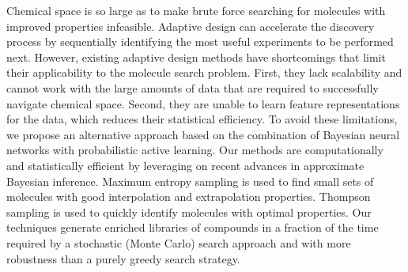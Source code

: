 
Chemical space is so large as to make brute force searching for molecules with
improved properties infeasible. Adaptive design can accelerate the discovery
process by sequentially identifying the most useful experiments to be performed
next. However, existing adaptive design methods have shortcomings that limit
their applicability to the molecule search problem. First, they lack
scalability and cannot work with the large amounts of data that are required to
successfully navigate chemical space. Second, they are unable to learn feature
representations for the data, which reduces their statistical efficiency. To
avoid these limitations, we propose an alternative approach based on the
combination of Bayesian neural networks with probabilistic active learning. Our
methods are computationally and statistically efficient by leveraging on recent
advances in approximate Bayesian inference. Maximum entropy sampling is used
to find small sets of molecules with good interpolation and extrapolation properties. Thompson
sampling is used to quickly identify molecules with optimal properties. Our
techniques generate enriched libraries of compounds in a fraction
of the time required by a stochastic (Monte Carlo) search approach and with
more robustness than a purely greedy search strategy.

